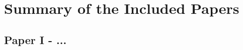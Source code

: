 
\chapter{Summary of the Included Papers}
\label{chap:summary_of_the_included_papers}

\noindent \lipsum[1]

\section{Paper I - ...}
\label{sec:paper1}